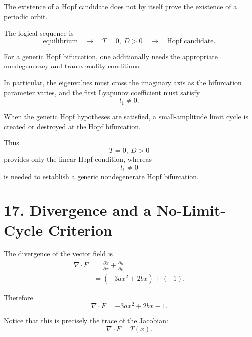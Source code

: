 \documentclass[11pt,a4paper]{article}
\begin{document}
The existence of a Hopf candidate does not by itself prove the
existence of a periodic orbit.

The logical sequence is
\begin{equation}
\boxed{
\text{equilibrium}
\quad\longrightarrow\quad
T=0,\ D>0
\quad\longrightarrow\quad
\text{Hopf candidate}.
}
\tag{58}
\end{equation}

For a generic Hopf bifurcation, one additionally needs the appropriate
nondegeneracy and transversality conditions.

In particular, the eigenvalues must cross the imaginary axis as the
bifurcation parameter varies, and the first Lyapunov coefficient must
satisfy
\begin{equation}
\boxed{
l_1\neq0.
}
\tag{59}
\end{equation}

When the generic Hopf hypotheses are satisfied, a small-amplitude
limit cycle is created or destroyed at the Hopf bifurcation.

Thus
\begin{equation}
\boxed{
T=0,\ D>0
}
\end{equation}
provides only the linear Hopf condition, whereas
\begin{equation}
\boxed{
l_1\neq0
}
\end{equation}
is needed to establish a generic nondegenerate Hopf bifurcation.

\section{17. Divergence and a No-Limit-Cycle Criterion}

The divergence of the vector field is
\begin{align}
\nabla\cdot F
&=
\frac{\partial \dot{x}}{\partial x}
+
\frac{\partial \dot{y}}{\partial y}\\
&=
(-3ax^2+2bx)+(-1).
\end{align}

Therefore
\begin{equation}
\boxed{
\nabla\cdot F
=
-3ax^2+2bx-1.
}
\tag{60}
\end{equation}

Notice that this is precisely the trace of the Jacobian:
\begin{equation}
\boxed{
\nabla\cdot F=T(x).
}
\tag{61}
\end{equation}
\end{document}
